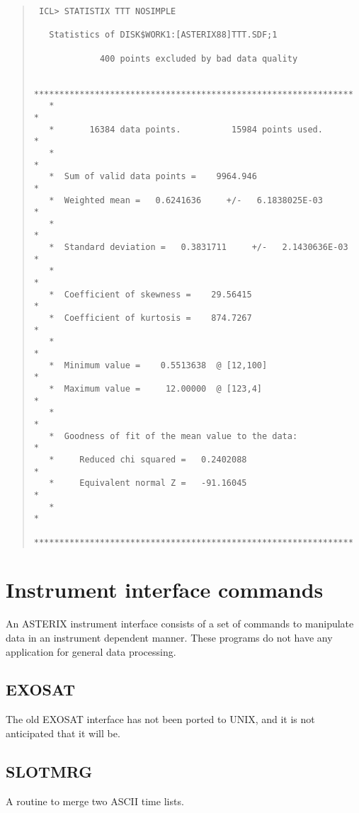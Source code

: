 \documentclass{book}
\renewcommand{\_}{{\tt\char'137}}     %
\begin{document}
\begin{quote}\begin{verbatim}
 ICL> STATISTIX TTT NOSIMPLE

   Statistics of DISK$WORK1:[ASTERIX88]TTT.SDF;1

             400 points excluded by bad data quality

   ***************************************************************
   *                                                             *
   *       16384 data points.          15984 points used.        *
   *                                                             *
   *  Sum of valid data points =    9964.946                     *
   *  Weighted mean =   0.6241636     +/-   6.1838025E-03        *
   *                                                             *
   *  Standard deviation =   0.3831711     +/-   2.1430636E-03   *
   *                                                             *
   *  Coefficient of skewness =    29.56415                      *
   *  Coefficient of kurtosis =    874.7267                      *
   *                                                             *
   *  Minimum value =    0.5513638  @ [12,100]                   *
   *  Maximum value =     12.00000  @ [123,4]                    *
   *                                                             *
   *  Goodness of fit of the mean value to the data:             *
   *     Reduced chi squared =   0.2402088                       *
   *     Equivalent normal Z =   -91.16045                       *
   *                                                             *
   ***************************************************************
\end{verbatim}\end{quote}
\chapter{Instrument interface commands}
An ASTERIX instrument interface consists of a set of commands to
manipulate data in an instrument dependent manner. These programs
do not have any application for general data processing.

\section{EXOSAT}
The old EXOSAT interface has not been ported to UNIX, and it is not
anticipated that it will be.

\section{SLOTMRG}
A routine to merge two ASCII time lists.
\end{document}

